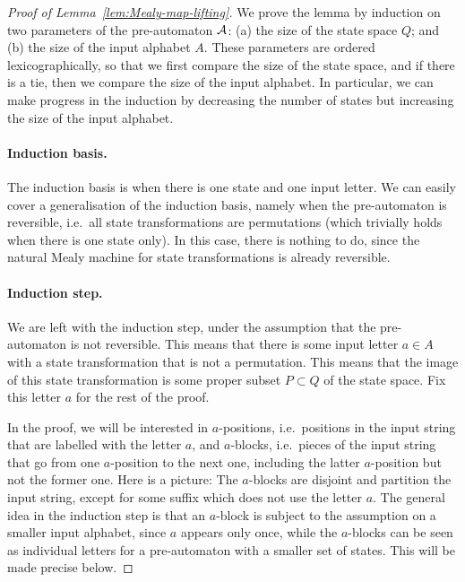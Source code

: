 \begin{proof}[Proof of Lemma~\ref{lem:Mealy-map-lifting}]
We prove the lemma by induction on two parameters of the pre-automaton ${\mathcal A}$: (a) the size of the state space $Q$; and (b) the size of the input alphabet $A$. These parameters are ordered lexicographically, so that we first compare the size of the state space, and if there is a tie, then we compare the size of the input alphabet. In particular, we can make progress in the induction by decreasing the number of states but increasing the size of the input alphabet. 

\paragraph*{Induction basis.} The induction basis is when there is one state and one input letter. We can easily cover a generalisation of the induction basis, namely when the pre-automaton is reversible, i.e.~all  state transformations are permutations (which trivially holds when there is one state only). In this case, there is nothing to do, since the natural Mealy machine for state transformations is already reversible. 

\paragraph*{Induction step.} We are left with the induction step, under the assumption that the pre-automaton is not reversible. This means that there is some input letter $a \in A$ with a state  transformation that is  not a permutation. This means that the image of this state transformation is some proper subset $P \subset Q$ of the state space.   Fix this letter $a$ for the rest of the proof. 

In the proof, we will be interested in $a$-positions, i.e.~positions in the input string that are labelled with the letter $a$, and $a$-blocks, i.e.~pieces of the input string that go from one $a$-position to the next one, including the latter $a$-position but not the former one. Here is a picture:
The $a$-blocks are disjoint and partition the input string, except for some suffix which does not use the letter $a$. 
The general idea in the induction step is  that an $a$-block is subject to the assumption on a smaller input alphabet, since $a$ appears only once, while the $a$-blocks can be seen as individual letters for a pre-automaton with a smaller set of states. This will be made precise below.




\end{proof}
